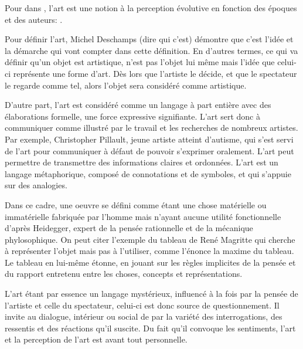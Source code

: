 \documentclass[12pt]{article} %
\begin{document}
Pour \citeauthor{SDavies1991} dans , l'art est une notion à la perception évolutive en fonction des époques et des auteurs:  \cite{SDavies1991}. 

Pour définir l'art, Michel Deschamps (dire qui c'est) démontre que c'est l'idée et la démarche qui vont compter dans cette définition. En d'autres termes, ce qui va définir qu'un objet est artistique, n'est pas l'objet lui même mais l'idée que celui-ci représente une forme d'art. Dès lors que l'artiste le décide, et que le spectateur le regarde comme tel, alors l'objet sera considéré comme artistique.

D'autre part, l'art est considéré comme un langage à part entière avec des élaborations formelle, une force expressive signifiante. L'art sert donc à communiquer comme illustré par le travail et les recherches de nombreux artistes. Par exemple, Christopher Pillault, jeune artiste atteint d'autisme, qui s'est servi de l'art pour communiquer à défaut de pouvoir s'exprimer oralement. L'art peut permettre de transmettre des informations claires et ordonnées. L'art est un langage métaphorique, composé de connotations et de symboles, et qui s'appuie sur des analogies. 

Dans ce cadre, une oeuvre se défini comme étant une chose matérielle ou immatérielle fabriquée par l'homme mais n'ayant aucune utilité fonctionnelle d'après Heidegger, expert de la pensée rationnelle et de la mécanique phylosophique. On peut citer l'exemple du tableau de René Magritte  qui cherche à représenter l'objet mais pas à l'utiliser, comme l'énonce la maxime  du tableau\cite{RMAgritte1929}. Le tableau en lui-même étonne, en jouant sur les règles implicites de la pensée et du rapport entretenu entre les choses, concepts et représentations.

L'art étant par essence un langage mystérieux, influencé à la fois par la pensée de l'artiste et celle du spectateur, celui-ci est donc source de questionnement. Il invite au dialogue, intérieur ou social de par la variété des interrogations, des ressentis et des réactions qu'il suscite. Du fait qu'il convoque les sentiments, l'art et la perception de l'art est avant tout personnelle.
\end{document}
